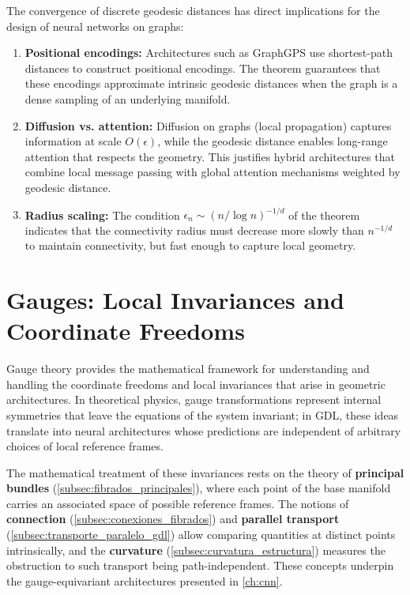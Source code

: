 	The convergence of discrete geodesic distances has direct implications for the design of neural networks on graphs:

\begin{enumerate}
	\item \textbf{Positional encodings:} Architectures such as GraphGPS \citep{rampasek2022graphgps} use shortest-path distances to construct positional encodings. The theorem guarantees that these encodings approximate intrinsic geodesic distances when the graph is a dense sampling of an underlying manifold.
	\item \textbf{Diffusion vs. attention:} Diffusion on graphs (local propagation) captures information at scale $O(\epsilon)$, while the geodesic distance enables long-range attention that respects the geometry. This justifies hybrid architectures that combine local message passing with global attention mechanisms weighted by geodesic distance.
	\item \textbf{Radius scaling:} The condition $\epsilon_n \sim (n / \log n)^{-1/d}$ of the theorem indicates that the connectivity radius must decrease more slowly than $n^{-1/d}$ to maintain connectivity, but fast enough to capture local geometry.
\end{enumerate}


\section{Gauges: Local Invariances and Coordinate Freedoms}\label{sec:gauges_invarianzas}

Gauge theory provides the mathematical framework for understanding and handling the coordinate freedoms and local invariances that arise in geometric architectures. In theoretical physics, gauge transformations represent internal symmetries that leave the equations of the system invariant; in \gls{GDL}, these ideas translate into neural architectures whose predictions are independent of arbitrary choices of local reference frames.

The mathematical treatment of these invariances rests on the theory of \textbf{principal bundles} (\autoref{subsec:fibrados_principales}), where each point of the base manifold carries an associated space of possible reference frames. The notions of \textbf{connection} (\autoref{subsec:conexiones_fibrados}) and \textbf{parallel transport} (\autoref{subsec:transporte_paralelo_gdl}) allow comparing quantities at distinct points intrinsically, and the \textbf{curvature} (\autoref{subsec:curvatura_estructura}) measures the obstruction to such transport being path-independent. These concepts underpin the gauge-equivariant architectures presented in \autoref{ch:cnn}.

